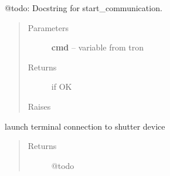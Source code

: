 \documentclass[letterpaper,10pt,english]{sphinxmanual}
\begin{document}
\begin{fulllineitems}

\begin{fulllineitems}
\label{enuActor.Devices:enuActor.Devices.shutter.Shutter.shutter}
\end{fulllineitems}


\begin{fulllineitems}
\label{enuActor.Devices:enuActor.Devices.shutter.Shutter.shutter_id}
\end{fulllineitems}


\begin{fulllineitems}
\label{enuActor.Devices:enuActor.Devices.shutter.Shutter.start_communication}
@todo: Docstring for start\_communication.
\begin{quote}\begin{description}
\item[{Parameters}] \leavevmode
\textbf{cmd} -- variable from tron

\item[{Returns}]  if OK

\item[{Raises}] \leavevmode
{\hyperref[enuActor.Devices:enuActor.Devices.Error.CommErr]{}}

\end{description}\end{quote}

\end{fulllineitems}


\begin{fulllineitems}
\label{enuActor.Devices:enuActor.Devices.shutter.Shutter.terminal}
launch terminal connection to shutter device
\begin{quote}\begin{description}
\item[{Returns}] \leavevmode
@todo

\end{description}\end{quote}

\end{fulllineitems}


\end{fulllineitems}
\end{document}
